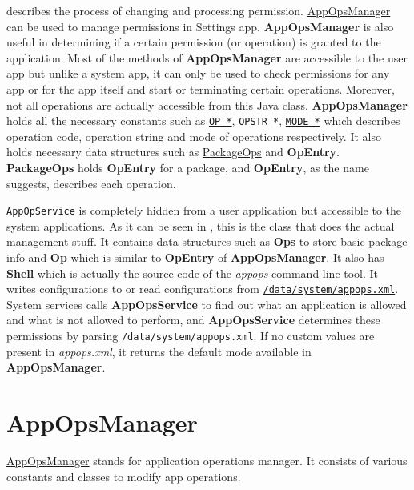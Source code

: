  describes the process of changing and processing permission.
\hyperref[sec:appopsmanager]{AppOpsManager} can be used to manage permissions in Settings app. \textbf{AppOpsManager} is
also useful in determining if a certain permission (or operation) is granted to the application. Most of the methods of
\textbf{AppOpsManager} are accessible to the user app but unlike a system app, it can only be used to check permissions
for any app or for the app itself and start or terminating certain operations. Moreover, not all operations are actually
accessible from this Java class. \textbf{AppOpsManager} holds all the necessary constants such as
\hyperref[subsec:op-constants]{\texttt{OP\_*}}, \texttt{OPSTR\_*}, \hyperref[subsec:mode-constants]{\texttt{MODE\_*}}
which describes operation code, operation string and mode of operations respectively. It also holds necessary data
structures such as \hyperref[subsec:package-ops]{PackageOps} and \textbf{OpEntry}. \textbf{PackageOps} holds
\textbf{OpEntry} for a package, and \textbf{OpEntry}, as the name suggests, describes each operation.

\texttt{AppOpService} is completely hidden from a user application but accessible to the system applications.
As it can be seen in , this is the class that does the actual management stuff.
It contains data structures such as \textbf{Ops} to store basic package info and \textbf{Op} which is similar to
\textbf{OpEntry} of \textbf{AppOpsManager}.
It also has \textbf{Shell} which is actually the source code of the \hyperref[sec:appops-cli]{\textit{appops} command line tool}.
It writes configurations to or read configurations from \hyperref[sec:appops-xml]{\texttt{/data/system/appops.xml}}.
System services calls \textbf{AppOpsService} to find out what an application is allowed and what is not allowed to perform,
and \textbf{AppOpsService} determines these permissions by parsing \texttt{/data/system/appops.xml}. If no custom values
are present in \textit{appops.xml}, it returns the default mode available in \textbf{AppOpsManager}.

\section{AppOpsManager}\label{sec:appopsmanager}
\href{https://android.googlesource.com/platform/frameworks/base/+/master/core/java/android/app/AppOpsManager.java}{AppOpsManager}
stands for application operations manager. It consists of various constants and classes to modify app operations.

